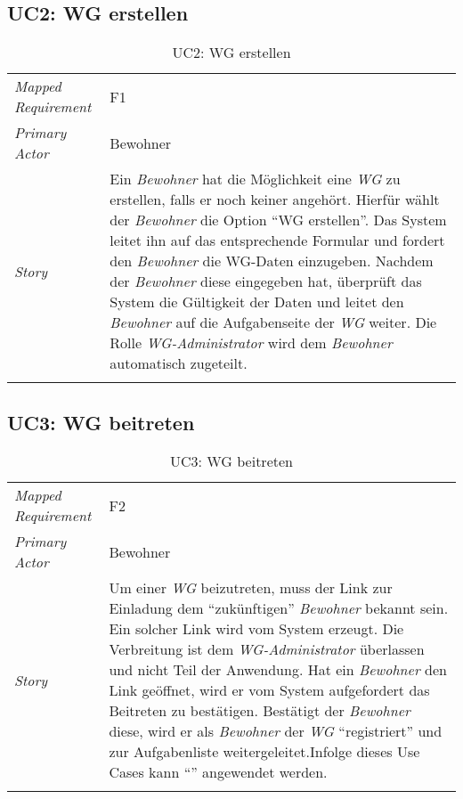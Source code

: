 \subsection{UC2: WG erstellen}\label{subsec:uc2}
\begin{table}[H]
	\tablestyle
	\tablealtcolored
	\begin{tabularx}{\textwidth}{lX}
		\tablebody
			\textit{Mapped Requirement} &
			F1
			\tabularnewline
			\textit{Primary Actor} &
			Bewohner
			\tabularnewline
			\textit{Story} &
			Ein \emph{Bewohner} hat die Möglichkeit eine \emph{WG} zu erstellen, falls er noch keiner angehört. Hierfür wählt der \emph{Bewohner} die Option ``WG erstellen''. Das System leitet ihn auf das entsprechende Formular und fordert den \emph{Bewohner} die WG-Daten einzugeben. Nachdem der \emph{Bewohner} diese eingegeben hat, überprüft das System die Gültigkeit der Daten und leitet den \emph{Bewohner} auf die Aufgabenseite der \emph{WG} weiter. Die Rolle \emph{WG-Administrator} wird dem \emph{Bewohner} automatisch zugeteilt.
			\tabularnewline
		\tableend
	\end{tabularx}
	\caption{UC2: WG erstellen}
\end{table}


\subsection{UC3: WG beitreten}\label{subsec:uc3}
\begin{table}[H]
	\tablestyle
	\tablealtcolored
	\begin{tabularx}{\textwidth}{lX}
		\tablebody
			\textit{Mapped Requirement} &
			F2
			\tabularnewline
			\textit{Primary Actor} &
			Bewohner
			\tabularnewline
			\textit{Story} &
			Um einer \emph{WG} beizutreten, muss der Link zur Einladung dem ``zukünftigen'' \emph{Bewohner} bekannt sein. Ein solcher Link wird vom System erzeugt. Die Verbreitung ist dem \emph{WG-Administrator} überlassen und nicht Teil der Anwendung. Hat ein \emph{Bewohner} den Link geöffnet, wird er vom System aufgefordert das Beitreten zu bestätigen. Bestätigt der \emph{Bewohner} diese, wird er als \emph{Bewohner} der \emph{WG} ``registriert'' und zur Aufgabenliste weitergeleitet.\newline Infolge dieses Use Cases kann ``\nameref{subsec:uc11}'' angewendet werden.
			\tabularnewline
		\tableend
	\end{tabularx}
	\caption{UC3: WG beitreten}
\end{table}


